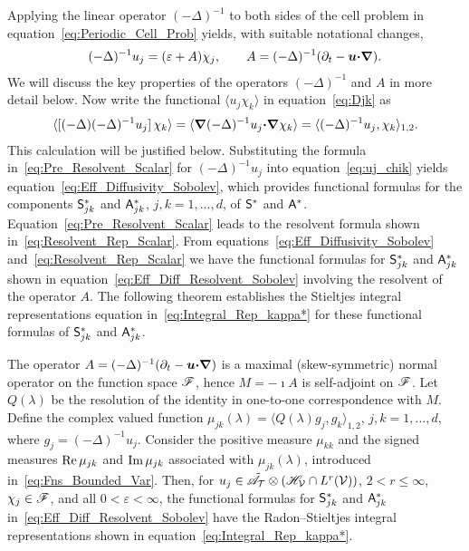 \documentclass[amsa]{ipart}
\begin{document}
Applying the linear operator $(-\Delta)^{-1}$ to both sides of the cell
problem in equation~\eqref{eq:Periodic_Cell_Prob} yields, with
suitable notational changes,
%
\begin{align}\label{eq:Pre_Resolvent_Scalar}
  (-\Delta)^{-1}u_j=(\varepsilon+A)\chi_j,
  \qquad
  A=(-\Delta)^{-1}(\partial_t-\vecu \bcdot\bnabla).
\end{align}
%
We will discuss the key properties of the operators $(-\Delta)^{-1}$ and
$A$ in more detail below.  Now write the functional $\langle u_j\chi_k\rangle$ in 
equation~\eqref{eq:Djk} as~\cite{Pavliotis:PHD_Thesis}       
%
\begin{align}\label{eq:uj_chik}
  \langle[(-\Delta)(-\Delta)^{-1}u_j]\,\chi_k\rangle
       =\langle\bnabla(-\Delta)^{-1}u_j\bcdot\bnabla \chi_k\rangle
       =\langle(-\Delta)^{-1}u_j,\chi_k\rangle_{1,2}.
\end{align}
%
This calculation will be justified below. Substituting the  
formula in~\eqref{eq:Pre_Resolvent_Scalar} for $(-\Delta)^{-1}u_j$ 
into equation~\eqref{eq:uj_chik} yields
equation~\eqref{eq:Eff_Diffusivity_Sobolev}, which provides functional
formulas for the components
$\mathsf{S}^*_{jk}$ and $\mathsf{A}^*_{jk}$, $j,k=1,\ldots,d$, of $\mathsf{S}^*$ and $\mathsf{A}^*$.
Equation~\eqref{eq:Pre_Resolvent_Scalar}   
leads to the resolvent formula shown
in~\eqref{eq:Resolvent_Rep_Scalar}.  
From equations~\eqref{eq:Eff_Diffusivity_Sobolev}
and~\eqref{eq:Resolvent_Rep_Scalar} we have the functional formulas
for $\mathsf{S}^*_{jk}$ and $\mathsf{A}^*_{jk}$ shown in 
equation~\eqref{eq:Eff_Diff_Resolvent_Sobolev} involving the resolvent
of the operator $A$. The following theorem establishes the 
Stieltjes integral representations equation
in~\eqref{eq:Integral_Rep_kappa*} for these functional formulas of
$\mathsf{S}^*_{jk}$ and $\mathsf{A}^*_{jk}$.  



%
\begin{theorem}\label{thm:Integral_Reps}
  The operator $A=(-\Delta)^{-1}(\partial_t-\boldsymbol{u}\mbox{\boldmath${\cdot}$}\mbox{\boldmath${\nabla}$})$ is a maximal
  (skew-symmetric) normal operator on the function space $\mathscr{F}$, hence
  $M=-\imath A$ is self-adjoint on $\mathscr{F}$. Let $Q(\lambda)$ be the resolution of
  the identity in one-to-one correspondence with $M$. Define the
  complex valued function $\mu_{jk}(\lambda)=\langle Q(\lambda)g_j,g_k\rangle_{1,2}$,
  $j,k=1,\ldots,d$, where $g_j=(-\Delta)^{-1}u_j$. Consider the positive measure
  $\mu_{kk}$ and the signed measures $\mbox{Re}\,\mu_{jk}$ and $\mbox{Im}\,\mu_{jk}$
  associated with $\mu_{jk}(\lambda)$, introduced
  in~\eqref{eq:Fns_Bounded_Var}.  Then, for
  $u_j\in\tilde{\mathscr{A}}_{\mathcal{T}}\otimes(\mathscr{H}_{\mathcal{V}}\cap L^r(\mathcal{V}))$, $2<r\leq\infty$,
  $\chi_j\in\mathscr{F}$, and all $0<\varepsilon<\infty$, the functional formulas for $\mathsf{S}^*_{jk}$
  and $\mathsf{A}^*_{jk}$ in~\eqref{eq:Eff_Diff_Resolvent_Sobolev} have the
  Radon--Stieltjes integral representations shown in
  equation~\eqref{eq:Integral_Rep_kappa*}.     
% 
\end{theorem}
%
\end{document}
